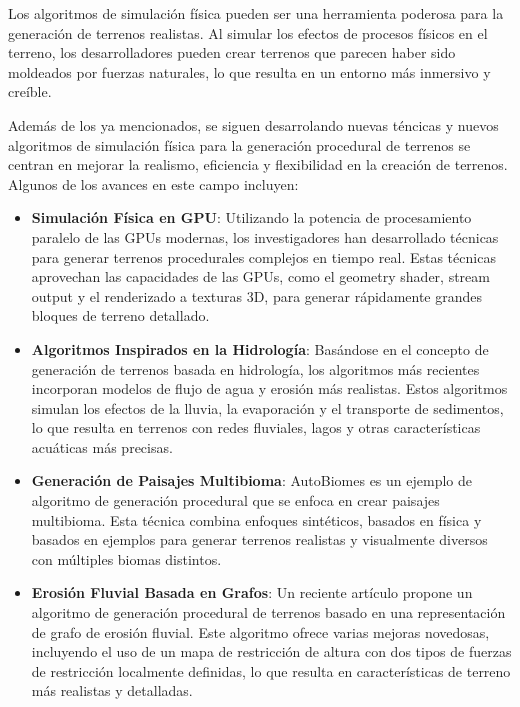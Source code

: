 Los algoritmos de simulación física pueden ser una herramienta poderosa para la generación de terrenos realistas. Al simular los efectos de procesos físicos en el terreno, los desarrolladores pueden crear terrenos que parecen haber sido moldeados por fuerzas naturales, lo que resulta en un entorno más inmersivo y creíble. 

Además de los ya mencionados, se siguen desarrolando nuevas téncicas y nuevos algoritmos de simulación física para la generación procedural de terrenos se centran en mejorar la realismo, eficiencia y flexibilidad en la creación de terrenos. Algunos de los avances en este campo incluyen:

\begin{itemize}
    \item \textbf{Simulación Física en GPU}: Utilizando la potencia de procesamiento paralelo de las GPUs modernas, los investigadores han desarrollado técnicas para generar terrenos procedurales complejos en tiempo real. Estas técnicas aprovechan las capacidades de las GPUs, como el geometry shader, stream output y el renderizado a texturas 3D, para generar rápidamente grandes bloques de terreno detallado\cite{SimulacionFisicaGPU}.
    
    \item \textbf{Algoritmos Inspirados en la Hidrología}: Basándose en el concepto de generación de terrenos basada en hidrología, los algoritmos más recientes incorporan modelos de flujo de agua y erosión más realistas. Estos algoritmos simulan los efectos de la lluvia, la evaporación y el transporte de sedimentos, lo que resulta en terrenos con redes fluviales, lagos y otras características acuáticas más precisas\cite{AlgoritmosHidrologia}.
    
    \item \textbf{Generación de Paisajes Multibioma}: AutoBiomes es un ejemplo de algoritmo de generación procedural que se enfoca en crear paisajes multibioma. Esta técnica combina enfoques sintéticos, basados en física y basados en ejemplos para generar terrenos realistas y visualmente diversos con múltiples biomas distintos\cite{GeneracionMultiBioma}.
    
    \item \textbf{Erosión Fluvial Basada en Grafos}: Un reciente artículo propone un algoritmo de generación procedural de terrenos basado en una representación de grafo de erosión fluvial. Este algoritmo ofrece varias mejoras novedosas, incluyendo el uso de un mapa de restricción de altura con dos tipos de fuerzas de restricción localmente definidas, lo que resulta en características de terreno más realistas y detalladas\cite{ErosionBasadaGrafos}.
    
\end{itemize}


